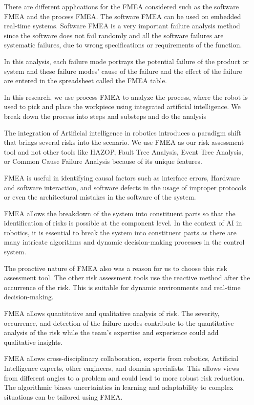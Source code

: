 {There are different applications for the FMEA considered such as the software FMEA and the process FMEA. The software FMEA can be used on embedded real-time systems. Software FMEA is a very important failure analysis method since the software does not fail randomly and all the software failures are systematic failures, due to wrong specifications or requirements of the function.

In this analysis, each failure mode portrays the potential failure of the product or system and these failure modes' cause of the failure and the effect of the failure are entered in the spreadsheet called the FMEA table. 

In this research, we use process FMEA to analyze the process, where the robot is used to pick and place the workpiece using integrated artificial intelligence. We break down the process into steps and substeps and do the analysis 
 
 The integration of Artificial intelligence in robotics introduces a paradigm shift that brings several risks into the scenario. We use FMEA as our risk assessment tool and not other tools like HAZOP, Fault Tree Analysis, Event Tree Analysis, or Common Cause Failure Analysis because of its unique features.
  
  FMEA is useful in identifying causal factors such as interface errors, Hardware and software interaction, and software defects in the usage of improper protocols or even the architectural mistakes in the software of the system.
 
 FMEA allows the breakdown of the system into constituent parts so that the identification of risks is possible at the component level. In the context of AI in robotics, it is essential to break the system into constituent parts as there are many intricate algorithms and dynamic decision-making processes in the control system.
 
 The proactive nature of FMEA also was a reason for us to choose this risk assessment tool. The other risk assessment tools use the reactive method after the occurrence of the risk. This is suitable for dynamic environments and real-time decision-making.

FMEA allows quantitative and qualitative analysis of risk. The severity, occurrence, and detection of the failure modes contribute to the quantitative analysis of the risk while the team's expertise and experience could add qualitative insights. 

FMEA allows cross-disciplinary collaboration, experts from robotics, Artificial Intelligence experts, other engineers, and domain specialists. This allows views from different angles to a problem and could lead to more robust risk reduction. The algorithmic biases uncertainties in learning and adaptability to complex situations can be tailored using FMEA. 

}
